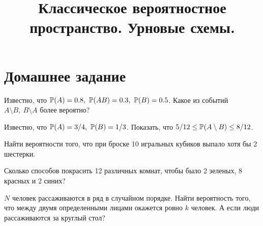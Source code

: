 

\title{Классическое вероятностное пространство. Урновые схемы.} 
\date{\vspace{-1cm}}


\maketitle

\section*{Домашнее задание}
\begin{problem}
    Известно, что $\operatorname{\mathbb{P}}(A) = 0.8,\ \operatorname{\mathbb{P}}(AB) = 0.3,\ \operatorname{\mathbb{P}}(B) = 0.5$.
    Какое из событий $A \setminus B,\ B \setminus A$ более вероятно?
\end{problem}

\begin{problem}
    Известно, что $\operatorname{\mathbb{P}}(A) = 3 / 4,\ \operatorname{\mathbb{P}}(B) = 1 / 3$.
    Показать, что $5 / 12 \leq \operatorname{\mathbb{P}}(A \setminus B) \leq 8 / 12$.
\end{problem}

\begin{problem}
    Найти вероятности того, что при броске 10 игральных кубиков выпало хотя бы 2 шестерки.
\end{problem}

\begin{problem}
    Сколько способов покрасить 12 различных комнат, чтобы было 2 зеленых, 8 красных и 2 синих?
\end{problem}

\begin{problem}
    $N$ человек рассаживаются в ряд в случайном порядке.
    Найти вероятность того, что между двумя определенными лицами окажется ровно $k$ человек.
    А если люди рассаживаются за круглый стол?
\end{problem}

% 




